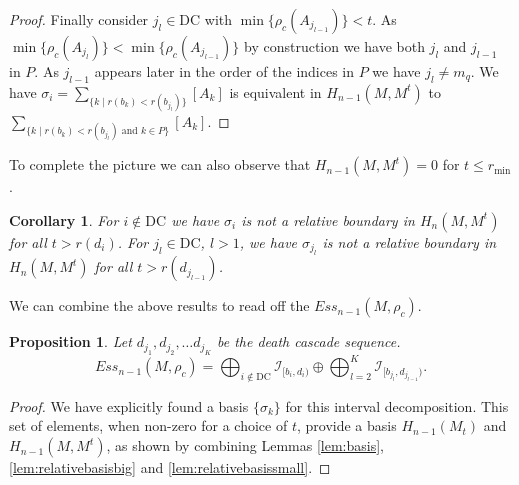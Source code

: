 \documentclass[a4paper,11pt]{article}
\newtheorem{prop}[theorem]{Proposition}
\newtheorem{cor}[theorem]{Corollary}
\theoremstyle{definition}
\newcommand{\DC}{\text{DC}}
\begin{document}
\begin{proof}
Finally consider $j_l \in \DC$ with $\min \{\rho_c(A_{j_{l-1}})\} < t$. As $\min \{\rho_c(A_{j_{l}})\} < \min \{\rho_c(A_{j_{l-1}})\}$ by construction we have both $j_l$ and $j_{l-1}$ in $P$. As $j_{l-1}$ appears later in the order of the indices in $P$ we have $j_l\neq m_q$.  
We have $\sigma_i=\sum_{\{k\mid r(b_k)<r(b_{j_l})\}}[A_k]$ is equivalent in $H_{n-1}(M, M^t)$ to $\sum_{\{k \mid r(b_k)<r(b_{j_l}) \text{ and } k\in P\}}[A_k]$.

\end{proof}


To complete the picture we can also observe that $H_{n-1}(M, M^t)=0$ for $t\leq r_{\min}$.

\begin{cor}
For $i\notin \DC$ we have $\sigma_i$ is not a relative boundary in $H_n(M, M^t)$ for all $t>r(d_i)$. For $j_l\in \DC$, $l>1$, we have  $\sigma_{j_l}$ is not a relative boundary in $H_n(M, M^t)$ for all $t>r(d_{j_{l-1}})$.
\end{cor}

We can combine the above results to read off the $Ess_{n-1}(M,\rho_c)$.

\begin{prop}\label{prop:ess_n-1}
Let $d_{j_1}, d_{j_2}, \ldots d_{j_K}$ be the death cascade sequence.
$$Ess_{n-1}(M,\rho_c)=\bigoplus_{i\notin \DC} \mathcal{I}_{[b_i, d_i)} \oplus \bigoplus_{l=2}^{K}\mathcal{I}_{[b_{j_l}, d_{j_{l-1}})}.$$
\end{prop}
\begin{proof}
We have explicitly found a basis $\{\sigma_k\}$ for this interval decomposition. This set of elements, when non-zero for a choice of $t$, provide a basis $H_{n-1}(M_t)$ and $H_{n-1}(M, M^t)$, as shown by combining Lemmas \ref{lem:basis}, \ref{lem:relativebasisbig} and \ref{lem:relativebasissmall}.
\end{proof}
\end{document}
